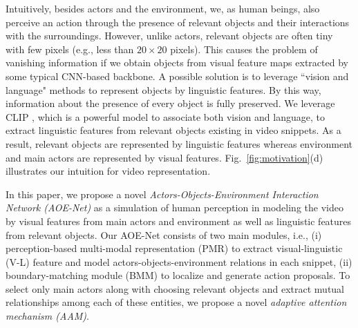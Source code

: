 \documentclass[sn-mathphys]{sn-jnl}
\theoremstyle{thmstyleone}\newtheorem{theorem}{Theorem}\newtheorem{proposition}[theorem]{Proposition}
\theoremstyle{thmstyletwo}\newtheorem{example}{Example}\newtheorem{remark}{Remark}
\theoremstyle{thmstylethree}\newtheorem{definition}{Definition}
\begin{document}
Intuitively, besides actors and the environment, we, as human beings, also perceive an action through the presence of relevant objects and their interactions with the surroundings.
However, unlike actors, relevant objects are often tiny with few pixels (e.g., less than $20 \times 20$ pixels). This causes the problem of vanishing information if we obtain objects from visual feature maps extracted by some typical CNN-based backbone. A possible solution is to leverage ``vision and language" methods \cite{mei2020vision, anderson2018bottom, radford2021learning} to represent objects by linguistic features. By this way, information about the presence of every object is fully preserved. We leverage CLIP \cite{radford2021learning}, which is a powerful model to associate both vision and language, to extract linguistic features from relevant objects existing in video snippets. As a result, relevant objects are represented by linguistic features whereas environment and main actors are represented by visual features. Fig.~\ref{fig:motivation}(d) illustrates our intuition for video representation.  




In this paper, we propose a novel \emph{Actors-Objects-Environment Interaction Network (AOE-Net)} as a simulation of human perception in modeling the video by visual features from main actors and environment as well as linguistic features from relevant objects. Our AOE-Net consists of two main modules, i.e., (i) perception-based multi-modal representation (PMR) to extract visual-linguistic (V-L) feature and model actors-objects-environment relations in each snippet, (ii) boundary-matching module (BMM) to localize and generate action proposals. To select only main actors along with choosing relevant objects and extract mutual relationships among each of these entities, we propose a novel \emph{adaptive attention mechanism (AAM)}.
\end{document}
